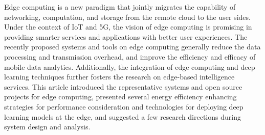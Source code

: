 \label{sec:conclusion}
Edge computing is a new paradigm that jointly migrates the capability of networking, computation, and storage from the remote cloud to the user sides. Under the context of IoT and 5G, the vision of edge computing is promising in providing smarter services and applications with better user experiences. The recently proposed systems and tools on edge computing generally reduce the data processing and transmission overhead, and improve the efficiency and efficacy of mobile data analytics. Additionally, the integration of edge computing and deep learning techniques further fosters the research on edge-based intelligence services. This article introduced the representative systems and open source projects for edge computing, presented several energy efficiency enhancing strategies for performance consideration and technologies for deploying deep learning models at the edge, and suggested a few research directions during system design and analysis.



